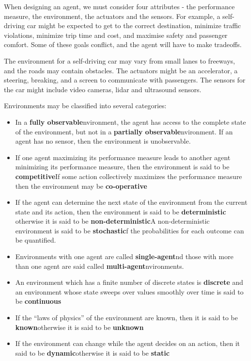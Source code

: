 \documentclass{article}
\begin{document}
When designing an agent, we must consider four attributes - the performance measure,
the environment, the actuators and the sensors. For example, a self-driving car might 
be expected to get to the correct destination, minimize traffic violations, minimize
trip time and cost, and maximise safety and passenger comfort. Some of these goals
conflict, and the agent will have to make tradeoffs.

The environment for a self-driving car may vary from small lanes to freeways, and the
roads may contain obstacles. The actuators might be an accelerator, a steering, breaking,
and a screen to communicate with passengers. The sensors for the car might include video
cameras, lidar and ultrasound sensors. 

Environments may be classified into several categories:

\begin{itemize}
    \item In a \textbf{fully observable}nvironment, the agent has access to the complete state of the environment,
        but not in a \textbf{partially observable}nvironment. If an agent has no sensor, then the
        environment is unobservable.
    \item If one agent maximizing its performance measure leads to another agent minimizing
        its performance measure, then the environment is said to be \textbf{competitive}If
        some action collectively maximizes the performance measure then the environment
        may be \textbf{co-operative}
    \item If the agent can determine the next state of the environment from the current
        state and its action, then the environment is said to be \textbf{deterministic}
        otherwise it is said to be \textbf{non-deterministic}A non-deterministic
        environment is said to be \textbf{stochastic}f the probabilities for each
        outcome can be quantified. 
    \item Environments with one agent are called \textbf{single-agent}nd those with
        more than one agent are said called \textbf{multi-agent}nvironments.
    \item An environment which has a finite number of discrete states is \textbf{discrete}
        and an environment whose state sweeps over values smoothly over time is said
        to be \textbf{continuous}
    \item If the ``laws of physics'' of the environment are known, then it is said to
        be \textbf{known}otherwise it is said to be \textbf{unknown}
    \item If the environment can change while the agent decides on an action, then it
        said to be \textbf{dynamic}otherwise it is said to be \textbf{static}
\end{itemize}
\end{document}
